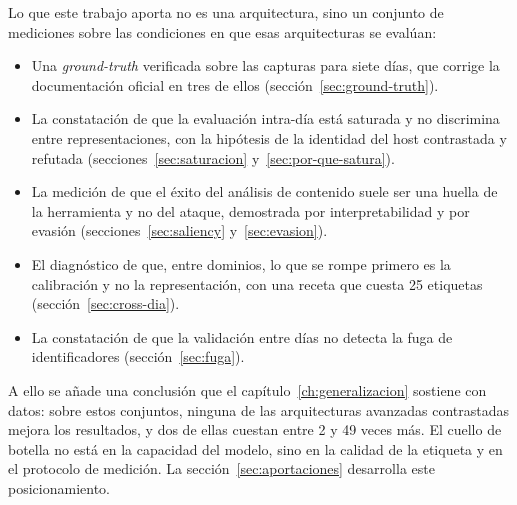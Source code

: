 Lo que este trabajo aporta no es una arquitectura, sino un conjunto de mediciones
sobre las condiciones en que esas arquitecturas se evalúan:

\begin{itemize}
  \item Una \emph{ground-truth} verificada sobre las capturas para siete días,
        que corrige la documentación oficial en tres de ellos
        (sección~\ref{sec:ground-truth}).
  \item La constatación de que la evaluación intra-día está saturada y no
        discrimina entre representaciones, con la hipótesis de la identidad del
        host contrastada y refutada (secciones~\ref{sec:saturacion}
        y~\ref{sec:por-que-satura}).
  \item La medición de que el éxito del análisis de contenido suele ser una
        huella de la herramienta y no del ataque, demostrada por
        interpretabilidad y por evasión (secciones~\ref{sec:saliency}
        y~\ref{sec:evasion}).
  \item El diagnóstico de que, entre dominios, lo que se rompe primero es la
        calibración y no la representación, con una receta que cuesta 25
        etiquetas (sección~\ref{sec:cross-dia}).
  \item La constatación de que la validación entre días no detecta la fuga de
        identificadores (sección~\ref{sec:fuga}).
\end{itemize}

A ello se añade una conclusión que el capítulo~\ref{ch:generalizacion} sostiene
con datos: sobre estos conjuntos, ninguna de las arquitecturas avanzadas
contrastadas mejora los resultados, y dos de ellas cuestan entre 2 y 49 veces
más. El cuello de botella no está en la capacidad del modelo, sino en la calidad
de la etiqueta y en el protocolo de medición. La
sección~\ref{sec:aportaciones} desarrolla este posicionamiento.

